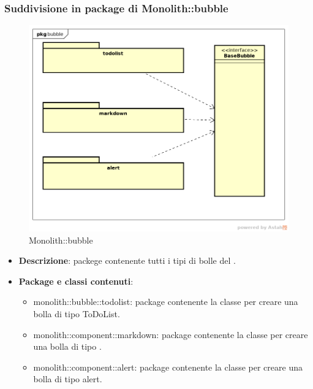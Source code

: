 \subsubsection{Suddivisione in package  di Monolith::bubble}
\label{Monolith::bubble}
\begin{figure}[H]
	\centering
	\includegraphics[scale=0.5]{Sezioni/imgPackage/bubble.png}
	\caption{Monolith::bubble}
\end{figure}
\begin{itemize}
	\item{\textbf{Descrizione}}: packege contenente tutti i tipi di bolle del .
	\item{\textbf{Package e classi contenuti}}:
	\begin{itemize}
	\item{monolith::bubble::todolist}: package contenente la classe per creare una bolla di tipo ToDoList.
	\item{monolith::component::markdown}: package contenente la classe per creare una bolla di tipo .
	\item{monolith::component::alert}: package contenente la classe per creare una bolla di tipo alert.

	\end{itemize}

\end{itemize}


